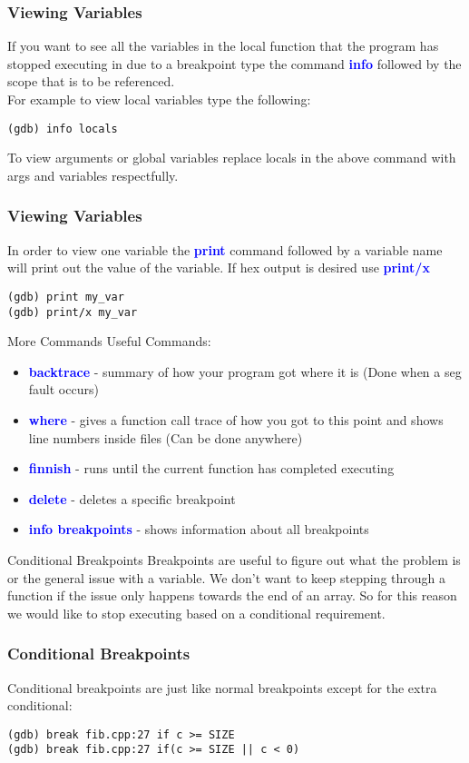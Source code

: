 \documentclass[11pt]{beamer}
\begin{document}
\begin{frame}[fragile]
\frametitle{Viewing Variables}
If you want to see all the variables in the local function that the program has stopped executing in due to a breakpoint type the command \textbf{\textcolor{blue}{info}} followed by the scope that is to be referenced. \\
For example to view local variables type the following:
\begin{lstlisting}[style=BashInputStyle]
(gdb) info locals
\end{lstlisting}
To view arguments or global variables replace locals in the above command with args and variables respectfully.
\end{frame}

\begin{frame}[fragile]
\frametitle{Viewing Variables}
In order to view one variable the \textbf{\textcolor{blue}{print}} command followed by a variable name will print out the value of the variable. If hex output is desired use \textbf{\textcolor{blue}{print/x}}
\begin{lstlisting}[style=BashInputStyle]
(gdb) print my_var
(gdb) print/x my_var
\end{lstlisting}
\end{frame}

\begin{frame}{More Commands}
Useful Commands:
\begin{itemize}
\item \textbf{\textcolor{blue}{backtrace}} - summary of how your program got where it is (Done when a seg fault occurs)
\item \textbf{\textcolor{blue}{where}} - gives a function call trace of how you got to this point and shows line numbers inside files (Can be done anywhere)
\item \textbf{\textcolor{blue}{finnish}} - runs until the current function has completed executing
\item \textbf{\textcolor{blue}{delete}} - deletes a specific breakpoint
\item \textbf{\textcolor{blue}{info breakpoints}} - shows information about all breakpoints
\end{itemize}
\end{frame}


\begin{frame}{Conditional Breakpoints}
Breakpoints are useful to figure out what the problem is or the general issue with a variable. 
\break
\break
We don't want to keep stepping through a function if the issue only happens towards the end of an array. 
\break
\break
So for this reason we would like to stop executing based on a conditional requirement.
\end{frame}

\begin{frame}[fragile]
\frametitle{Conditional Breakpoints}
Conditional breakpoints are just like normal breakpoints except for the extra conditional:
\begin{lstlisting}[style=BashInputStyle]
(gdb) break fib.cpp:27 if c >= SIZE
(gdb) break fib.cpp:27 if(c >= SIZE || c < 0)
\end{lstlisting}
\end{frame}
\end{document}
